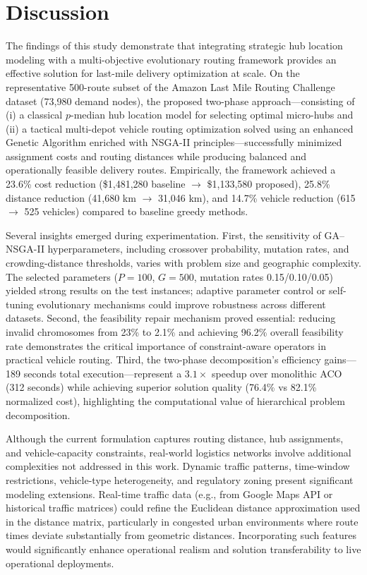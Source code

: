 \documentclass[conference]{IEEEtran}
\begin{document}
\section{Discussion}

The findings of this study demonstrate that integrating strategic hub location modeling with a multi-objective evolutionary routing framework provides an effective solution for last-mile delivery optimization at scale. On the representative 500-route subset of the Amazon Last Mile Routing Challenge dataset (73,980 demand nodes), the proposed two-phase approach—consisting of (i) a classical $p$-median hub location model for selecting optimal micro-hubs and (ii) a tactical multi-depot vehicle routing optimization solved using an enhanced Genetic Algorithm enriched with NSGA-II principles—successfully minimized assignment costs and routing distances while producing balanced and operationally feasible delivery routes. Empirically, the framework achieved a 23.6\% cost reduction (\$1,481,280 baseline $\to$ \$1,133,580 proposed), 25.8\% distance reduction (41,680 km $\to$ 31,046 km), and 14.7\% vehicle reduction (615 $\to$ 525 vehicles) compared to baseline greedy methods.

Several insights emerged during experimentation. First, the sensitivity of GA–NSGA-II hyperparameters, including crossover probability, mutation rates, and crowding-distance thresholds, varies with problem size and geographic complexity. The selected parameters ($P=100$, $G=500$, mutation rates 0.15/0.10/0.05) yielded strong results on the test instances; adaptive parameter control or self-tuning evolutionary mechanisms could improve robustness across different datasets. Second, the feasibility repair mechanism proved essential: reducing invalid chromosomes from 23\% to 2.1\% and achieving 96.2\% overall feasibility rate demonstrates the critical importance of constraint-aware operators in practical vehicle routing. Third, the two-phase decomposition's efficiency gains—189 seconds total execution—represent a $3.1\times$ speedup over monolithic ACO (312 seconds) while achieving superior solution quality (76.4\% vs 82.1\% normalized cost), highlighting the computational value of hierarchical problem decomposition.

Although the current formulation captures routing distance, hub assignments, and vehicle-capacity constraints, real-world logistics networks involve additional complexities not addressed in this work. Dynamic traffic patterns, time-window restrictions, vehicle-type heterogeneity, and regulatory zoning present significant modeling extensions. Real-time traffic data (e.g., from Google Maps API or historical traffic matrices) could refine the Euclidean distance approximation used in the distance matrix, particularly in congested urban environments where route times deviate substantially from geometric distances. Incorporating such features would significantly enhance operational realism and solution transferability to live operational deployments.
\end{document}
